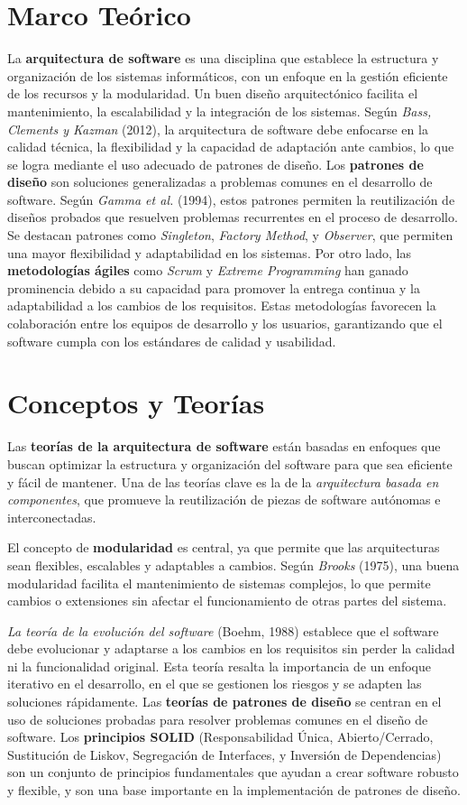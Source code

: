 \documentclass[twocolumn]{article}
\begin{document}
\section{Marco Teórico}
La \textbf{arquitectura de software} es una disciplina que establece la estructura y organización de los sistemas informáticos, con un enfoque en la gestión eficiente de los recursos y la modularidad.
Un buen diseño arquitectónico facilita el mantenimiento, la escalabilidad y la integración de los sistemas. Según \textit{Bass, Clements y Kazman} (2012), la arquitectura de software debe enfocarse en la calidad técnica, la flexibilidad y la capacidad de adaptación ante cambios, lo que se logra mediante el uso adecuado de patrones de diseño.
Los \textbf{patrones de diseño} son soluciones generalizadas a problemas comunes en el desarrollo de software. Según \textit{Gamma et al.} (1994), estos patrones permiten la reutilización de diseños probados que resuelven problemas recurrentes en el proceso de desarrollo. Se destacan patrones como \textit{Singleton}, \textit{Factory Method}, y \textit{Observer}, que permiten una mayor flexibilidad y adaptabilidad en los sistemas.
Por otro lado, las \textbf{metodologías ágiles} como \textit{Scrum} y \textit{Extreme Programming} han ganado prominencia debido a su capacidad para promover la entrega continua y la adaptabilidad a los cambios de los requisitos. Estas metodologías favorecen la colaboración entre los equipos de desarrollo y los usuarios, garantizando que el software cumpla con los estándares de calidad y usabilidad.
\section{Conceptos y Teorías}
Las \textbf{teorías de la arquitectura de software} están basadas en enfoques que buscan optimizar la estructura y organización del software para que sea eficiente y fácil de mantener. Una de las teorías clave es la de la \textit{arquitectura basada en componentes}, que promueve la reutilización de piezas de software autónomas e interconectadas.

El concepto de \textbf{modularidad} es central, ya que permite que las arquitecturas sean flexibles, escalables y adaptables a cambios. Según \textit{Brooks} (1975), una buena modularidad facilita el mantenimiento de sistemas complejos, lo que permite cambios o extensiones sin afectar el funcionamiento de otras partes del sistema.

\textit{La teoría de la evolución del software} (Boehm, 1988) establece que el software debe evolucionar y adaptarse a los cambios en los requisitos sin perder la calidad ni la funcionalidad original. Esta teoría resalta la importancia de un enfoque iterativo en el desarrollo, en el que se gestionen los riesgos y se adapten las soluciones rápidamente.
Las \textbf{teorías de patrones de diseño} se centran en el uso de soluciones probadas para resolver problemas comunes en el diseño de software. Los \textbf{principios SOLID} (Responsabilidad Única, Abierto/Cerrado, Sustitución de Liskov, Segregación de Interfaces, y Inversión de Dependencias) son un conjunto de principios fundamentales que ayudan a crear software robusto y flexible, y son una base importante en la implementación de patrones de diseño.
\end{document}
